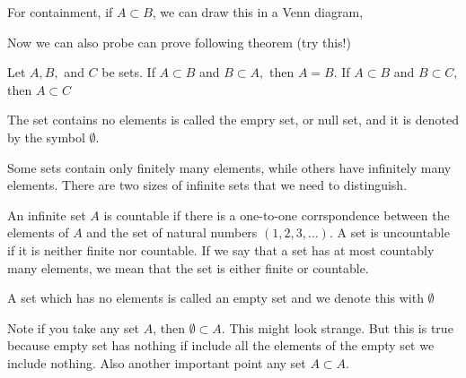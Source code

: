 \documentclass[ 11pt,%
				a4paper,%
				oneside,%
				headinclude,%
				footinclude = true,%
				cleardoublepage = empty,%
				reqno]{scrbook}
\begin{document}
For containment, if $A \subset B$, we can draw this in a Venn diagram,


\begin{figure}[H]
	\begin{center}
	\end{center}
\end{figure}




Now we can also probe can prove following theorem (try this!)

\begin{theorem}
Let $A, B,$ and $C$ be sets. If $A \subset B$ and $B \subset A,$ then $A=B .$ If $A \subset B$ and $B \subset C,$ then $A \subset C$
\end{theorem}

\begin{definition}
	The set contains no elements is called the empry set, or null set, and it is denoted by the symbol $\emptyset$. 
\end{definition}

Some sets contain only finitely many elements, while others have infinitely many elements. There are two sizes of infinite sets that we need to distinguish.


\begin{definition}
	 An infinite set $A$ is countable if there is a one-to-one corrspondence between the elements of $A$ and the set of natural numbers $(1,2,3, \ldots)$. A set is uncountable if it is neither finite nor countable. If we say that a set has at most countably many elements, we mean that the set is either finite or countable.
\end{definition}
 
\begin{definition}

A set which has no elements is called an empty set and we denote this with $\emptyset$
	
\end{definition}

Note if you take any set $A$, then $\emptyset \subset A$. This might look strange. But this is true because empty set has nothing if include all the elements of the empty set we include nothing. Also another important point any set $A \subset A$.
\end{document}
